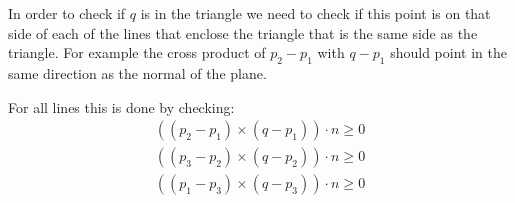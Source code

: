 \documentclass[a4paper]{scrartcl}
\begin{document}
        In order to check if $q$ is in the triangle we need to check if this point is on
        that side of each of the lines that enclose the triangle that is the same side as the 
        triangle. For example the cross product of $p_2 - p_1$ with $q - p_1$ should point in 
        the same direction as the normal of the plane. 

        For all lines this is done by checking:
        \begin{align*}
          ((p_2 - p_1) \times (q - p_1)) \cdot n \geq 0 \\
          ((p_3 - p_2) \times (q - p_2)) \cdot n \geq 0 \\
          ((p_1 - p_3) \times (q - p_3)) \cdot n \geq 0 
        \end{align*}
\end{document}
